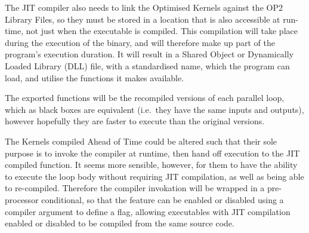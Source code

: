 \begin{figure}[h!]
{{
  }}
\end{figure}

The JIT compiler also needs to link the Optimised Kernels against the OP2 Library Files, so they must be stored in a location that is also accessible at run-time, not just when the executable is compiled. This compilation will take place during the execution of the binary, and will therefore make up part of the program's execution duration. It will result in a Shared Object or Dynamically Loaded Library (DLL) file, with a standardised name, which the program can load, and utilise the functions it makes available.
\par
The exported functions will be the recompiled versions of each parallel loop, which as black boxes are equivalent (i.e.\ they have the same inputs and outputs), however hopefully they are faster to execute than the original versions.
\par
The Kernels compiled Ahead of Time could be altered such that their sole purpose is to invoke the compiler at runtime, then hand off execution to the JIT compiled function. It seems more sensible, however, for them to have the ability to execute the loop body without requiring JIT compilation, as well as being able to re-compiled. Therefore the compiler invokation will be wrapped in a pre-processor conditional, so that the feature can be enabled or disabled using a compiler argument to define a flag, allowing executables with JIT compilation enabled or disabled to be compiled from the same source code.
